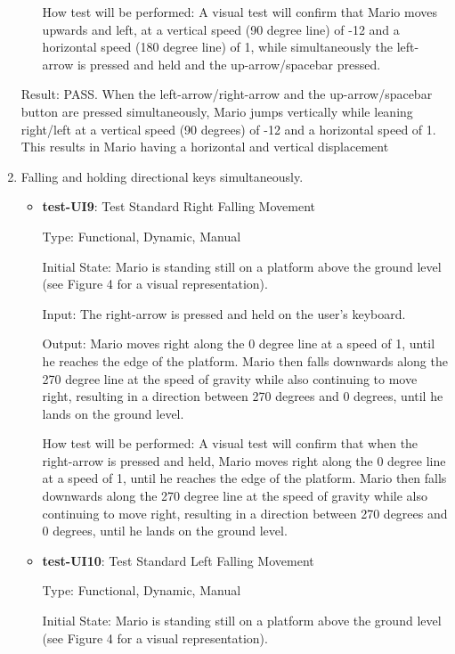 \documentclass[12pt, titlepage]{article}
\begin{document}
\begin{enumerate}
\begin{itemize}
How test will be performed: A visual test will confirm that Mario moves upwards and left, at a vertical speed (90 degree line) of -12 and a horizontal speed (180 degree line) of 1, while simultaneously the left-arrow is pressed and held and the up-arrow/spacebar pressed.

\end{itemize}

Result: PASS. When the left-arrow/right-arrow and the up-arrow/spacebar button are pressed simultaneously, Mario jumps vertically while leaning right/left at a vertical speed (90 degrees) of -12 and a horizontal speed of 1. This results in Mario having a horizontal and vertical displacement

\item Falling and holding directional keys simultaneously.
\begin{itemize}

\item{\textbf{test-UI9}: Test Standard Right Falling Movement\\}

Type: Functional, Dynamic, Manual
					
Initial State: Mario is standing still on a platform above the ground level (see Figure 4 for a visual representation).
					
Input: The right-arrow is pressed and held on the user's keyboard.
					
Output: Mario moves right along the 0 degree line at a speed of 1, until he reaches the edge of the platform. Mario then falls downwards along the 270 degree line at the speed of gravity while also continuing to move right, resulting in a direction between 270 degrees and 0 degrees, until he lands on the ground level.
					
How test will be performed: A visual test will confirm that when the right-arrow is pressed and held, Mario moves right along the 0 degree line at a speed of 1, until he reaches the edge of the platform. Mario then falls downwards along the 270 degree line at the speed of gravity while also continuing to move right, resulting in a direction between 270 degrees and 0 degrees, until he lands on the ground level.


\item{\textbf{test-UI10}: Test Standard Left Falling Movement\\}

Type: Functional, Dynamic, Manual
					
Initial State: Mario is standing still on a platform above the ground level (see Figure 4 for a visual representation).
					

\end{itemize}
\end{enumerate}
\end{document}
